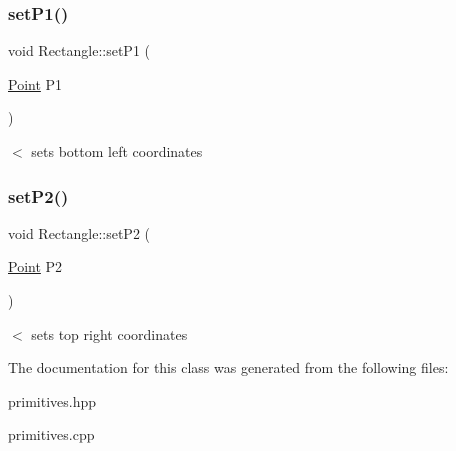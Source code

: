 \subsubsection{\texorpdfstring{set\+P1()}{setP1()}}
{\footnotesize\ttfamily void Rectangle\+::set\+P1 (\begin{DoxyParamCaption}\item[{\hyperlink{classPoint}{Point}}]{P1 }\end{DoxyParamCaption})}

$<$ sets bottom left coordinates \mbox{\label{classRectangle_a7049caae9f8e6850a18bbd629c8b1db6}} 
\subsubsection{\texorpdfstring{set\+P2()}{setP2()}}
{\footnotesize\ttfamily void Rectangle\+::set\+P2 (\begin{DoxyParamCaption}\item[{\hyperlink{classPoint}{Point}}]{P2 }\end{DoxyParamCaption})}

$<$ sets top right coordinates 

The documentation for this class was generated from the following files\+:\begin{DoxyCompactItemize}
\item 
primitives.\+hpp\item 
primitives.\+cpp\end{DoxyCompactItemize}
